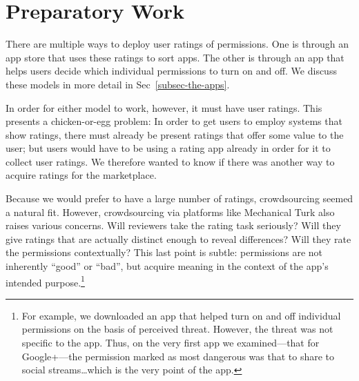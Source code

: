 \documentclass[11pt]{article}
\begin{document}
\section{Preparatory Work}
\label{sec-prep-work}

There are multiple ways to deploy user ratings of permissions. One is
through an app store that uses these ratings to sort
apps. The other is through an app that helps users decide
which individual permissions to turn on and off. We discuss these
models in more detail in Sec~\ref{subsec-the-apps}.

In order for either model to work, however, it must have user
ratings. This presents a chicken-or-egg problem: In order to get users
to employ systems that show ratings, there must already be present
ratings that offer some value to the user; but users would have to be
using a rating app already in order for it to collect user
ratings. We therefore wanted to know if there was another way to
acquire ratings for the marketplace.

Because we would prefer to have a large number of ratings,
crowdsourcing seemed a natural fit. However, crowdsourcing via
platforms like Mechanical Turk also raises various concerns. Will
reviewers take the rating task seriously? Will they give ratings that
are actually distinct enough to reveal differences? Will they rate the
permissions contextually? This last point is subtle: permissions are
not inherently ``good'' or ``bad'', but acquire meaning in the context
of the app's intended purpose.\footnote{For example, we
  downloaded an app that helped turn on and off individual permissions
  on the basis of perceived threat. However, the threat was not
  specific to the app. Thus, on the very first app we examined---that
  for Google+---the permission marked as most dangerous was that to
  share to social streams\dots which is the very point of the app.}
\end{document}
